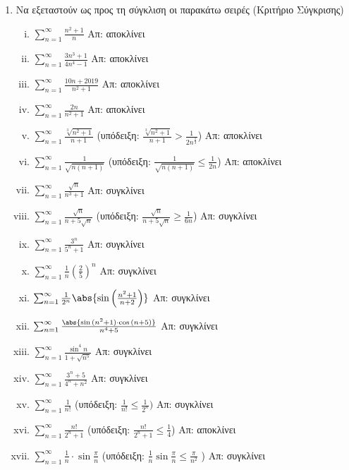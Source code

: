 \begin{enumerate}
    \item Να εξεταστούν ως προς τη σύγκλιση οι παρακάτω σειρές (Κριτήριο Σύγκρισης)
        \begin{enumerate}[i)]
            \item $ \sum_{n=1}^{\infty} \frac{n^{2}+1}{n} $ \hfill Απ: αποκλίνει 
            \item $ \sum_{n=1}^{\infty} \frac{3n^{3}+1}{4n^{4}-1} $ \hfill Απ: 
                αποκλίνει
            \item $ \sum_{n=1}^{\infty} \frac{10n+2019}{n^{2}+1} $ 
                \hfill Απ: αποκλίνει
            \item $ \sum_{n=1}^{\infty} \frac{2n}{n^{2}+1} $ \hfill Απ: αποκλίνει 
            \item $ \sum_{n=1}^{\infty} \frac{\sqrt[3]{n^{2}+1}}{n+1} $ 
                \qquad (υπόδειξη: $ \frac{\sqrt[3]{n^{2}+1}}{n+1} > 
                \frac{1}{2n^{\frac{1}{3} }} $) \hfill Απ: αποκλίνει 
            \item $ \sum_{n=1}^{\infty} \frac{1}{\sqrt{n(n+1)}} $ \qquad 
                (υπόδειξη: $ \frac{1}{\sqrt{n(n+1)}} \leq \frac{1}{2n}  $) 
                \hfill Απ: αποκλίνει 
            \item $ \sum_{n=1}^{\infty} \frac{\sqrt{n}}{n^{3}+1} $ \hfill Απ: συγκλίνει 
            \item $ \sum_{n=1}^{\infty} \frac{\sqrt{n}}{n+5 \sqrt{n}} $ \qquad 
                (υπόδειξη: $ \frac{\sqrt{n}}{n+5 \sqrt{n}} \geq   
                \frac{1}{6n} $) \hfill Απ: συγκλίνει 
            \item $ \sum_{n=1}^{\infty} \frac{3^{n}}{5^{n}+1} $ \hfill Απ: συγκλίνει 
            \item $ \sum_{n=1}^{\infty} \frac{1}{n} \left(\frac{2}{5} \right)^{n} $ 
                \hfill Απ: συγκλίνει
            \item $ \sum_{n=1}^{\infty} \frac{1}{2^{n}} 
                \abs{\sin{\left(\frac{n^{2}+1}{n+2}\right)}} $ \hfill Απ: συγκλίνει 
            \item $ \sum_{n=1}^{\infty} \frac{\abs{\sin{(n^{2}+1)} \cdot 
                \cos{(n+5)}}}{n^{4}+5} $ \hfill Απ: συγκλίνει 
            \item $ \sum_{n=1}^{\infty} \frac{\sin^{4}n}{1+ \sqrt{n^{5}}} $
                \hfill Απ: συγκλίνει 
            \item $ \sum_{n=1}^{\infty} \frac{3^{n}+5}{4^{n}+n^{2}} $ \hfill Απ: 
                συγκλίνει
            \item $ \sum_{n=1}^{\infty} \frac{1}{n!} $ \qquad (υπόδειξη: 
                $ \frac{1}{n!} \leq \frac{1}{2^{n}}) $ \hfill Απ: συγκλίνει 
            \item $ \sum_{n=1}^{\infty} \frac{n!}{2^{n}+1} $ \qquad (υπόδειξη: 
                $ \frac{n!}{2^{n}+1} \leq \frac{1}{4} $) \hfill Απ: αποκλίνει 
            \item $ \sum_{n=1}^{\infty} \frac{1}{n} \cdot \sin{\frac{\pi}{n}} $ 
                \qquad (υπόδειξη: $ \frac{1}{n} \sin{\frac{\pi}{n}} \leq 
                \frac{\pi}{n^{2}} $ ) \hfill Απ: συγκλίνει 
        \end{enumerate}


\end{enumerate}
